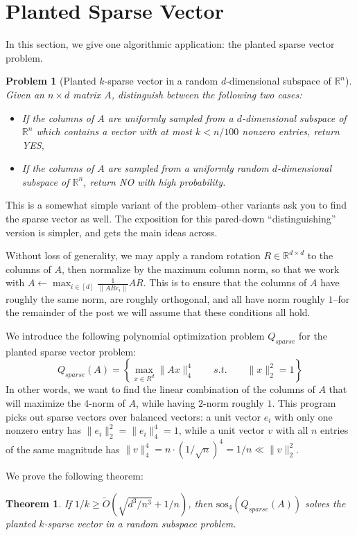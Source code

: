 \documentclass[a4paper,11pt]{article}
\newcommand{\R}{\mathbb{R}}
\newcommand{\sos}{\mathrm{sos}}
\newtheorem{theorem}{Theorem}
\newtheorem{problem}{Problem}
\theoremstyle{definition}
\begin{document}
\section{Planted Sparse Vector}

In this section, we give one algorithmic application: the planted sparse vector problem.

\begin{problem}[Planted $k$-sparse vector in a random $d$-dimensional subspace of $\R^n$]
Given an $n \times d$ matrix $A$, distinguish between the following two cases:
\begin{itemize}
\item If the columns of $A$ are uniformly sampled from a $d$-dimensional subspace of $\R^n$ which contains a vector with at most $k < n/100$ nonzero entries, return YES,
\item If the columns of $A$ are sampled from a uniformly random $d$-dimensional subspace of $\R^n$, return NO with high probability.
\end{itemize}
\end{problem}
This is a somewhat simple variant of the problem--other variants ask you to find the sparse vector as well.
The exposition for this pared-down ``distinguishing'' version is simpler, and gets the main ideas across.

Without loss of generality, we may apply a random rotation $R \in \R^{d\times d}$ to the columns of $A$, then normalize by the maximum column norm, so that we work with $A \leftarrow \max_{i\in[d]} \frac{1}{\|ARe_i\|}AR$.
This is to ensure that the columns of $A$ have roughly the same norm, are roughly orthogonal, and all have norm roughly $1$--for the remainder of the post we will assume that these conditions all hold.

We introduce the following polynomial optimization problem $Q_{sparse}$ for the planted sparse vector problem:
\[
Q_{sparse}(A) = \left\{
\max_{x \in R^d} \| Ax \|^4_4 \qquad s.t. \qquad \|x\|^2_2 = 1
\right\}
\]
In other words, we want to find the linear combination of the columns of $A$ that will maximize the $4$-norm of $A$, while having $2$-norm roughly $1$.
This program picks out sparse vectors over balanced vectors: a unit vector $e_i$ with only one nonzero entry has $\|e_i\|^2_2 = \|e_i\|^4_4 = 1$, while a unit vector $v$ with all $n$ entries of the same magnitude has $\|v\|_4^4 = n \cdot (1/\sqrt{n})^4 = 1/n \ll \|v\|_2^2$.

We prove the following theorem:
\begin{theorem}\label{thm:plsp}
If $1/k \ge \tilde{O}(\sqrt{d^3/n^3} + 1/n)$, then $\sos_4(Q_{sparse}(A))$ solves the planted $k$-sparse vector in a random subspace problem.
\end{theorem}
\end{document}
